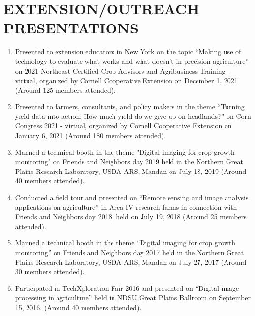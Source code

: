 \documentclass[11pt]{article}
\begin{document}
\section*{EXTENSION/OUTREACH PRESENTATIONS}
\begin{enumerate}[itemsep=-2pt]
\item Presented to extension educators in New York on the topic ``Making use of technology to evaluate what works and what doesn't in precision agriculture'' on 2021 Northeast Certified Crop Advisors and Agribusiness Training -- virtual, organized by Cornell Cooperative Extension on December 1, 2021 (Around 125 members attended).

\item Presented to farmers, consultants, and policy makers in the theme ``Turning yield data into action; How much yield do we give up on headlands?'' on Corn Congress 2021 - virtual, organized by Cornell Cooperative Extension on January 6, 2021 (Around 180 members attended).

\item Manned a technical booth in the theme "Digital imaging for crop growth monitoring" on Friends and Neighbors day 2019 held in the Northern Great Plains Research Laboratory, USDA-ARS, Mandan on July 18, 2019 (Around 40 members attended).


\item Conducted a field tour and presented on ``Remote sensing and image analysis applications on agriculture'' in Area IV research farms in connection with Friends and Neighbors day 2018, held on July 19, 2018 (Around 25 members attended). 

\item Manned a technical booth in the theme ``Digital imaging for crop growth monitoring'' on Friends and Neighbors day 2017 held in the Northern Great Plains Research Laboratory, USDA-ARS, Mandan on July 27, 2017 (Around 30 members attended).

\item Participated in TechXploration Fair 2016 and presented on ``Digital image processing in agriculture'' held in NDSU Great Plains Ballroom on September 15, 2016.  (Around 40 members attended).

\end{enumerate}
\end{document}

